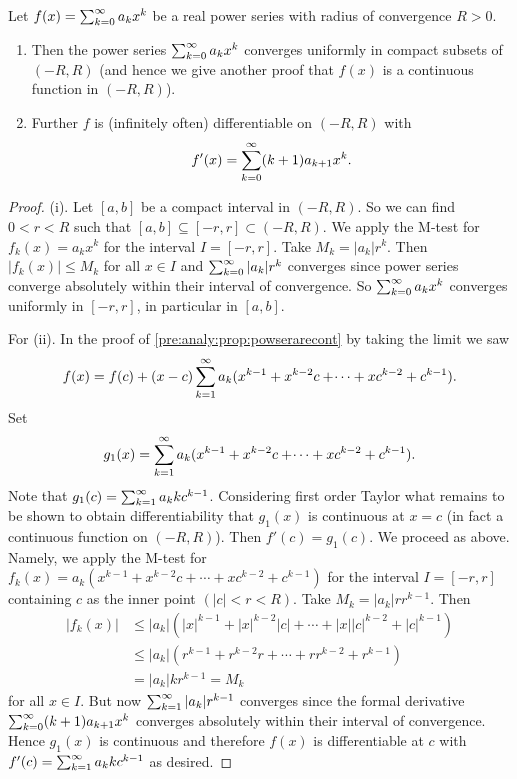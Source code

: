 \documentclass[10pt, a4paper]{article}
\begin{document}
\begin{theorem}
    Let $f(x) = \sum_{k = 0}^{\infty} a_kx ^ k$ be a real power series with radius of convergence $R > 0$.
    \begin{enumerate}[label = (\roman*)]
        \item Then the power series $\sum_{k = 0}^{\infty} a_kx ^ k$ converges uniformly in compact subsets of $(-R, R)$
        (and hence we give another proof that $f(x)$ is a continuous function in $(-R, R)$).

        \item Further $f$ is
        (infinitely often)
        differentiable on $(-R, R)$ with
        \[
        f'(x) = \sum_{k = 0}^{\infty}(k + 1)a_{k + 1}x ^ k.
        \]
    \end{enumerate}
    \begin{proof}
        (i).
        Let $[a, b]$ be a compact interval in $(-R, R)$.
        So we can find $0 < r < R$ such that $[a, b] \subseteq [-r, r] \subset (-R, R)$.
        We apply the M-test for $f_k(x) = a_kx ^ k$ for the interval $I = [-r, r]$.
        Take $M_k = |a_k|r ^ k$.
        Then $|f_k(x)| \leq M_k$ for all $x \in I$ and $\sum_{k = 0}^{\infty}|a_k|r ^ k$ converges since power series converge absolutely within their interval of convergence.
        So $\sum_{k = 0}^{\infty} a_kx ^ k$ converges uniformly in $[-r, r]$,
        in particular in $[a, b]$.

        For (ii).
        In the proof of \autoref{pre:analy:prop:powserarecont} by taking the limit we saw
        \[
        f(x) = f(c) + (x - c)\sum_{k = 1}^{\infty} a_k(x ^ {k - 1} + x ^ {k - 2}c + \dotsi + xc ^ {k - 2} + c ^ {k - 1}).
        \]
        Set
        \[
        g_1(x) = \sum_{k = 1}^{\infty} a_k(x ^ {k - 1} + x ^ {k - 2}c + \dotsi + xc ^ {k - 2} + c ^ {k - 1}).
        \]
        Note that $g_1(c) = \sum_{k = 1}^{\infty} a_kkc ^ {k - 1}$.
        Considering first order Taylor what remains to be shown to obtain differentiability that $g_1(x)$ is continuous at $x = c$
        (in fact a continuous function on $(-R, R)$).
        Then $f'(c) = g_1(c)$.
        We proceed as above.
        Namely,
        we apply the M-test for $f_k(x) = a_k(x ^ {k - 1} + x ^ {k - 2}c + \dotsi + xc ^ {k - 2} + c ^ {k - 1})$ for the interval $I = [-r, r]$ containing $c$ as the inner point $(|c| < r < R)$.
        Take $M_k = |a_k|rr ^ {k - 1}$.
        Then
        \begin{align*}
            |f_k(x)| &\leq |a_k|\left(|x| ^ {k - 1} + |x| ^ {k - 2}|c| + \dotsi + |x||c| ^ {k - 2} + |c| ^ {k - 1}\right) \\
            &\leq |a_k|(r ^ {k - 1} + r ^ {k - 2}r + \dotsi + rr ^ {k - 2} + r ^ {k - 1}) \\
            &= |a_k|kr ^ {k - 1} = M_k
        \end{align*}
        for all $x \in I$.
        But now $\sum_{k = 1}^{\infty}|a_k|r ^ {k - 1}$ converges since the formal derivative $\sum_{k = 0}^{\infty}(k + 1)a_{k + 1}x ^ k$ converges absolutely within their interval of convergence.
        Hence $g_1(x)$ is continuous and therefore $f(x)$ is differentiable at $c$ with $f'(c) = \sum_{k = 1}^{\infty} a_kkc ^ {k - 1}$ as desired.
    \end{proof}
\end{theorem}
\end{document}
